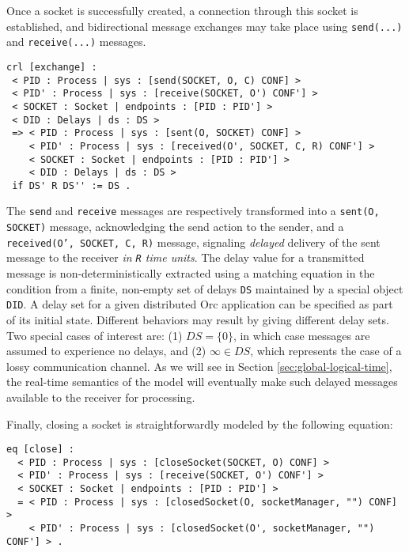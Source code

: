 \documentclass{eptcs}
\begin{document}
 
 
Once a socket is successfully created, a connection through this socket is established, and bidirectional message exchanges may take place using \texttt{send(...)} and \texttt{receive(...)} messages. 


\begin{small}
\begin{verbatim}
crl [exchange] : 
 < PID : Process | sys : [send(SOCKET, O, C) CONF] >
 < PID' : Process | sys : [receive(SOCKET, O') CONF'] >
 < SOCKET : Socket | endpoints : [PID : PID'] > 
 < DID : Delays | ds : DS > 
 => < PID : Process | sys : [sent(O, SOCKET) CONF] >
    < PID' : Process | sys : [received(O', SOCKET, C, R) CONF'] >
    < SOCKET : Socket | endpoints : [PID : PID'] > 
    < DID : Delays | ds : DS >
 if DS' R DS'' := DS .
\end{verbatim}
\end{small}

\noindent The \texttt{send} and \texttt{receive} messages are respectively transformed into a \texttt{sent(O, SOCKET)} message, acknowledging the send action to the sender, and a \texttt{received(O', SOCKET, C, R)} message, signaling \emph{delayed} delivery of the sent message to the receiver \emph{in \texttt{R}  time units}. The delay value for a transmitted message is non-deterministically extracted using a matching equation in the condition from a finite, non-empty set of delays \texttt{DS} maintained by a special object \texttt{DID}. A delay set for a given distributed Orc application can be specified as part of its initial state. Different behaviors may result by giving different delay sets. Two special cases of interest are: (1) $\mathit{DS} = \{ 0 \}$, in which case messages are assumed to experience no delays, and (2) $\infty \in  \mathit{DS}$, which represents the case of a lossy communication channel. As we will see in Section \ref{sec:global-logical-time}, the real-time semantics of the model will eventually make such delayed messages available to the receiver for processing. 

Finally, closing a socket is straightforwardly modeled by the following equation:

\begin{small}
\begin{verbatim}
eq [close] : 
  < PID : Process | sys : [closeSocket(SOCKET, O) CONF] >
  < PID' : Process | sys : [receive(SOCKET, O') CONF'] >
  < SOCKET : Socket | endpoints : [PID : PID'] > 
  = < PID : Process | sys : [closedSocket(O, socketManager, "") CONF] >
    < PID' : Process | sys : [closedSocket(O', socketManager, "") CONF'] > .
\end{verbatim}
\end{small}
\end{document}
